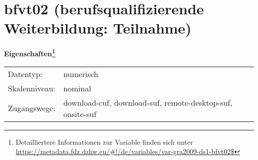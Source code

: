 
    \setcounter{footnote}{0}

    \vspace*{-1.8cm}
	\section{bfvt02 (berufsqualifizierende Weiterbildung: Teilnahme)}
	\label{section:bfvt02}



    \vspace*{0.5cm}
    \noindent\textbf{Eigenschaften\footnote{Detailliertere Informationen zur Variable finden sich unter
		\url{https://metadata.fdz.dzhw.eu/\#!/de/variables/var-gra2009-ds1-bfvt02$}}}\\
	\begin{tabularx}{\hsize}{@{}lX}
	Datentyp: & numerisch \\
	Skalenniveau: & nominal \\
	Zugangswege: &
	  download-cuf, 
	  download-suf, 
	  remote-desktop-suf, 
	  onsite-suf
 \\
    \end{tabularx}



